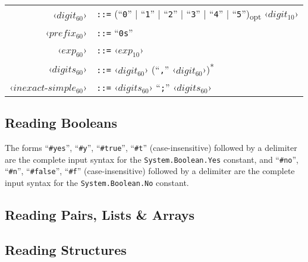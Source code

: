 \grammar
\begin{longtable}{ r l }
  ‹$digit_{60}$› & \lstinline!::=! (``\lstinline!0!'' | ``\lstinline!1!'' | ``\lstinline!2!'' | ``\lstinline!3!'' | ``\lstinline!4!'' | ``\lstinline!5!'')\textsubscript{opt} ‹$digit_{10}$› \\
  ‹$prefix_{60}$› & \lstinline!::=! ``\lstinline!0s!'' \\
  ‹$exp_{60}$› & \lstinline!::=! ‹$exp_{10}$› \\
  
  ‹$digits_{60}$› & \lstinline!::=! ‹$digit_{60}$› (``\lstinline!,!'' ‹$digit_{60}$›)\textsuperscript{*} \\
  ‹$inexact$-$simple_{60}$› & \lstinline!::=! ‹$digits_{60}$› ``\lstinline!;!'' ‹$digits_{60}$› \\
\end{longtable}






\subsection{Reading Booleans}
\label{subsec:aml-base-lang-reader-booleans}

The forms ``\lstinline!#yes!'', ``\lstinline!#y!'', ``\lstinline!#true!'', ``\lstinline!#t!'' (case-insensitive) followed by a delimiter are the complete input syntax for the \lstinline!System.Boolean.Yes! constant, and ``\lstinline!#no!'', ``\lstinline!#n!'', ``\lstinline!#false!'', ``\lstinline!#f!'' (case-insensitive) followed by a delimiter are the complete input syntax for the \lstinline!System.Boolean.No! constant.





\subsection{Reading Pairs, Lists \& Arrays}
\label{subsec:aml-base-lang-reader-lists}





\subsection{Reading Structures}
\label{subsec:aml-base-lang-reader-structures}





